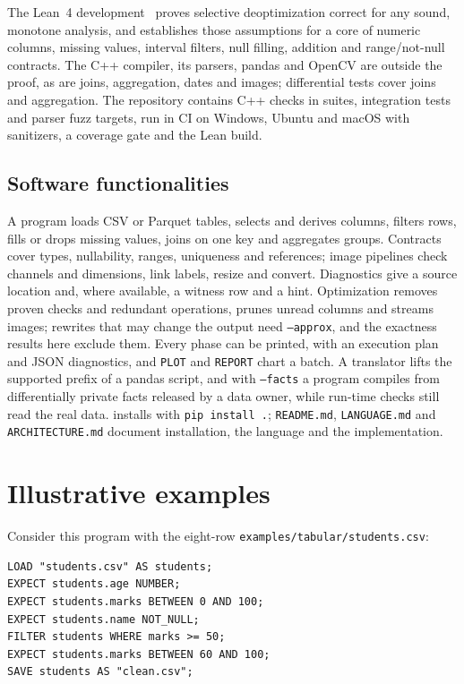 

The Lean~4 development~\cite{lean4} proves selective deoptimization correct for any sound, monotone
analysis, and establishes those assumptions for a core of numeric columns, missing values, interval
filters, null filling, addition and range/not-null contracts. The C++ compiler, its parsers, pandas and
OpenCV are outside the proof, as are joins, aggregation, dates and images; differential tests cover joins
and aggregation. The repository contains \TestCount{} C++ checks in \TestSuites{} suites, integration tests
and parser fuzz targets, run in CI on Windows, Ubuntu and macOS with sanitizers, a coverage gate and the
Lean build.

\subsection{Software functionalities}

A program loads CSV or Parquet tables, selects and derives columns, filters rows, fills or drops missing
values, joins on one key and aggregates groups. Contracts cover types, nullability, ranges, uniqueness and
references; image pipelines check channels and dimensions, link labels, resize and convert. Diagnostics
give a source location and, where available, a witness row and a hint. Optimization removes proven checks
and redundant operations, prunes unread columns and streams images; rewrites that may change the output
need \texttt{--approx}, and the exactness results here exclude them. Every phase can be printed, with an
execution plan and JSON diagnostics, and \texttt{PLOT} and \texttt{REPORT} chart a batch. A translator lifts
the supported prefix of a pandas script, and with \texttt{--facts} a program compiles from differentially
private facts released by a data owner, while run-time checks still read the real data. \PL installs with
\texttt{pip install .}; \texttt{README.md}, \texttt{LANGUAGE.md} and \texttt{ARCHITECTURE.md} document
installation, the language and the implementation.

\section{Illustrative examples}\label{sec:example}

Consider this program with the eight-row \texttt{examples/\allowbreak tabular/\allowbreak students.csv}:
\begin{lstlisting}
LOAD "students.csv" AS students;
EXPECT students.age NUMBER;
EXPECT students.marks BETWEEN 0 AND 100;
EXPECT students.name NOT_NULL;
FILTER students WHERE marks >= 50;
EXPECT students.marks BETWEEN 60 AND 100;
SAVE students AS "clean.csv";
\end{lstlisting}

